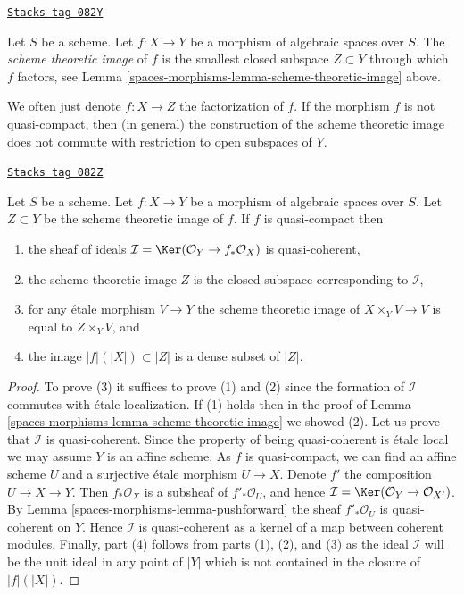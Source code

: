 \begin{definition}
\label{spaces-morphisms-definition-scheme-theoretic-image}
\href{https://stacks.math.columbia.edu/tag/082Y}{\texttt{Stacks tag 082Y}}

Let $S$ be a scheme. Let $f : X \to Y$ be a morphism of algebraic spaces
over $S$. The {\it scheme theoretic image} of $f$ is the smallest closed
subspace $Z \subset Y$ through which $f$
factors, see Lemma \ref{spaces-morphisms-lemma-scheme-theoretic-image} above.
\end{definition}

We often just denote $f : X \to Z$ the factorization of $f$.
If the morphism $f$ is not quasi-compact, then (in general) the
construction of the scheme theoretic image does not commute with
restriction to open subspaces of $Y$.

\begin{lemma}
\label{spaces-morphisms-lemma-quasi-compact-scheme-theoretic-image}
\href{https://stacks.math.columbia.edu/tag/082Z}{\texttt{Stacks tag 082Z}}

Let $S$ be a scheme.
Let $f : X \to Y$ be a morphism of algebraic spaces over $S$.
Let $Z \subset Y$ be the scheme theoretic image of $f$.
If $f$ is quasi-compact then
\begin{enumerate}
\item the sheaf of ideals
$\mathcal{I} = \Ker(\mathcal{O}_Y \to f_*\mathcal{O}_X)$
is quasi-coherent,
\item the scheme theoretic image $Z$ is the closed subspace
corresponding to $\mathcal{I}$,
\item for any \'etale morphism $V \to Y$ the scheme theoretic image of
$X \times_Y V \to V$ is equal to $Z \times_Y V$, and
\item the image $|f|(|X|) \subset |Z|$ is a dense subset of $|Z|$.
\end{enumerate}
\end{lemma}

\begin{proof}
To prove (3) it suffices to prove (1) and (2) since the
formation of $\mathcal{I}$ commutes with \'etale localization.
If (1) holds then in the proof of Lemma \ref{spaces-morphisms-lemma-scheme-theoretic-image}
we showed (2). Let us prove that $\mathcal{I}$ is quasi-coherent.
Since the property of being quasi-coherent is \'etale local we may
assume $Y$ is an affine scheme. As $f$ is quasi-compact,
we can find an affine scheme $U$ and a surjective \'etale morphism
$U \to X$. Denote $f'$ the composition $U \to X \to Y$.
Then $f_*\mathcal{O}_X$ is a subsheaf of $f'_*\mathcal{O}_U$,
and hence $\mathcal{I} = \Ker(\mathcal{O}_Y \to \mathcal{O}_{X'})$.
By Lemma \ref{spaces-morphisms-lemma-pushforward}
the sheaf $f'_*\mathcal{O}_U$ is quasi-coherent on $Y$. Hence $\mathcal{I}$
is quasi-coherent as a kernel of a map between coherent modules.
Finally, part (4) follows from parts (1), (2), and (3) as the ideal
$\mathcal{I}$ will be the unit ideal in any point of $|Y|$ which is
not contained in the closure of $|f|(|X|)$.
\end{proof}

